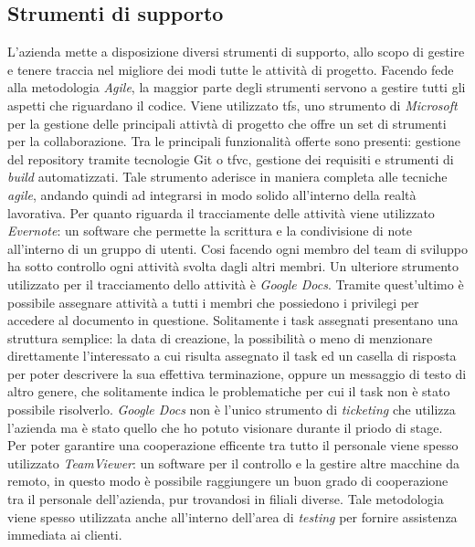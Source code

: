 \subsection{Strumenti di supporto }
L'azienda mette a disposizione diversi strumenti di supporto, allo scopo di gestire e tenere traccia nel migliore dei modi tutte le attività di progetto.
Facendo fede alla metodologia \textit{Agile}, la maggior parte degli strumenti servono a gestire tutti gli aspetti che riguardano il codice. Viene utilizzato \gls{tfs}, uno strumento di \textit{Microsoft} per la gestione delle principali attivtà di progetto che offre un set di strumenti per la collaborazione. Tra le principali funzionalità offerte sono presenti: gestione del repository tramite tecnologie Git o \gls{tfvc}, gestione dei requisiti e strumenti di \textit{build} automatizzati. Tale strumento aderisce in maniera completa alle tecniche \textit{agile}, andando quindi ad integrarsi in modo solido all'interno della realtà lavorativa. Per quanto riguarda il tracciamente delle attività viene utilizzato \textit{Evernote}: un software che permette la scrittura e la condivisione di note all'interno di un gruppo di utenti. Cosi facendo ogni membro del team di sviluppo ha sotto controllo ogni attività svolta dagli altri membri. Un ulteriore strumento utilizzato per il tracciamento dello attività è \textit{Google Docs}. Tramite quest'ultimo è possibile assegnare attività a tutti i membri che possiedono i privilegi per accedere al documento in questione. Solitamente i task assegnati presentano una struttura semplice: la data di creazione, la possibilità o meno di menzionare direttamente l'interessato a cui risulta assegnato il task ed un casella di risposta per poter descrivere la sua effettiva terminazione, oppure un messaggio di testo di altro genere, che solitamente indica le problematiche per cui il task non è stato possibile risolverlo. \textit{Google Docs} non è l'unico strumento di \textit{ticketing} che utilizza l'azienda ma è stato quello che ho potuto visionare durante il priodo di stage.\\
Per poter garantire una cooperazione efficente tra tutto il personale viene spesso utilizzato \textit{TeamViewer}: un software per il controllo e la gestire altre macchine da remoto, in questo modo è possibile raggiungere un buon grado di cooperazione tra il personale dell'azienda, pur trovandosi in filiali diverse. Tale metodologia viene spesso utilizzata anche all'interno dell'area di \textit{testing} per fornire assistenza immediata ai clienti.

